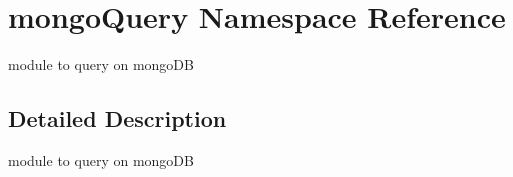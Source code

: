\hypertarget{namespacemongoQuery}{}\section{mongo\+Query Namespace Reference}
\label{namespacemongoQuery}


module to query on mongo\+DB  




\subsection{Detailed Description}
module to query on mongo\+DB 